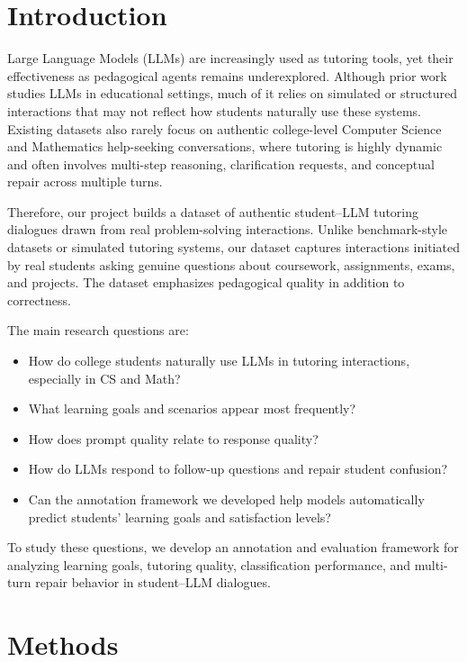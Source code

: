 \section{Introduction}

Large Language Models (LLMs) are increasingly used as tutoring tools, yet their effectiveness as pedagogical agents remains underexplored. Although prior work studies LLMs in educational settings, much of it relies on simulated or structured interactions that may not reflect how students naturally use these systems. Existing datasets also rarely focus on authentic college-level Computer Science and Mathematics help-seeking conversations, where tutoring is highly dynamic and often involves multi-step reasoning, clarification requests, and conceptual repair across multiple turns.

Therefore, our project builds a dataset of authentic student--LLM tutoring dialogues drawn from real problem-solving interactions. Unlike benchmark-style datasets or simulated tutoring systems, our dataset captures interactions initiated by real students asking genuine questions about coursework, assignments, exams, and projects. The dataset emphasizes pedagogical quality in addition to correctness.

The main research questions are:

\begin{itemize}
    \item How do college students naturally use LLMs in tutoring interactions, especially in CS and Math?
    \item What learning goals and scenarios appear most frequently?
    \item How does prompt quality relate to response quality?
    \item How do LLMs respond to follow-up questions and repair student confusion?
    \item Can the annotation framework we developed help models automatically predict students' learning goals and satisfaction levels?
\end{itemize}

To study these questions, we develop an annotation and evaluation framework for analyzing learning goals, tutoring quality, classification performance, and multi-turn repair behavior in student--LLM dialogues.

\section{Methods}

